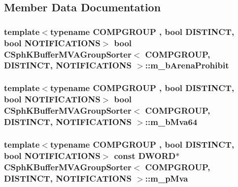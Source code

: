 \subsection{Member Data Documentation}
\hypertarget{classCSphKBufferMVAGroupSorter_ad2096f8141dce39d432d1b7010c103ea}{
\subsubsection[{m\-\_\-b\-Arena\-Prohibit}]{\setlength{\rightskip}{0pt plus 5cm}template$<$typename C\-O\-M\-P\-G\-R\-O\-U\-P , bool D\-I\-S\-T\-I\-N\-C\-T, bool N\-O\-T\-I\-F\-I\-C\-A\-T\-I\-O\-N\-S$>$ bool {\bf C\-Sph\-K\-Buffer\-M\-V\-A\-Group\-Sorter}$<$ C\-O\-M\-P\-G\-R\-O\-U\-P, D\-I\-S\-T\-I\-N\-C\-T, N\-O\-T\-I\-F\-I\-C\-A\-T\-I\-O\-N\-S $>$\-::m\-\_\-b\-Arena\-Prohibit\hspace{0.3cm}{\ttfamily [protected]}}}\label{classCSphKBufferMVAGroupSorter_ad2096f8141dce39d432d1b7010c103ea}
\hypertarget{classCSphKBufferMVAGroupSorter_a09070d8bc1a08f2653d104198108f1a3}{
\subsubsection[{m\-\_\-b\-Mva64}]{\setlength{\rightskip}{0pt plus 5cm}template$<$typename C\-O\-M\-P\-G\-R\-O\-U\-P , bool D\-I\-S\-T\-I\-N\-C\-T, bool N\-O\-T\-I\-F\-I\-C\-A\-T\-I\-O\-N\-S$>$ bool {\bf C\-Sph\-K\-Buffer\-M\-V\-A\-Group\-Sorter}$<$ C\-O\-M\-P\-G\-R\-O\-U\-P, D\-I\-S\-T\-I\-N\-C\-T, N\-O\-T\-I\-F\-I\-C\-A\-T\-I\-O\-N\-S $>$\-::m\-\_\-b\-Mva64\hspace{0.3cm}{\ttfamily [protected]}}}\label{classCSphKBufferMVAGroupSorter_a09070d8bc1a08f2653d104198108f1a3}
\hypertarget{classCSphKBufferMVAGroupSorter_a6c5f722befa68c234ed5da3d9b3bbf4e}{
\subsubsection[{m\-\_\-p\-Mva}]{\setlength{\rightskip}{0pt plus 5cm}template$<$typename C\-O\-M\-P\-G\-R\-O\-U\-P , bool D\-I\-S\-T\-I\-N\-C\-T, bool N\-O\-T\-I\-F\-I\-C\-A\-T\-I\-O\-N\-S$>$ const {\bf D\-W\-O\-R\-D}$\ast$ {\bf C\-Sph\-K\-Buffer\-M\-V\-A\-Group\-Sorter}$<$ C\-O\-M\-P\-G\-R\-O\-U\-P, D\-I\-S\-T\-I\-N\-C\-T, N\-O\-T\-I\-F\-I\-C\-A\-T\-I\-O\-N\-S $>$\-::m\-\_\-p\-Mva\hspace{0.3cm}{\ttfamily [protected]}}}\label{classCSphKBufferMVAGroupSorter_a6c5f722befa68c234ed5da3d9b3bbf4e}


